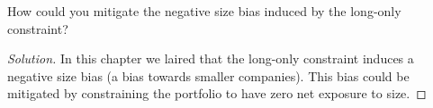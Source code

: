 \begin{problem}{15.3}
  How could you mitigate the negative size bias induced by the long-only constraint?
\end{problem}

\begin{proof}[Solution]
  In this chapter we laired that the long-only constraint induces a negative size bias (a bias towards smaller companies). This bias could be mitigated by constraining the portfolio to have zero net exposure to size.
\end{proof}

